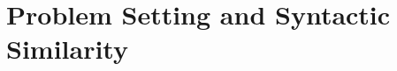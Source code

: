 \documentclass[letterpaper]{article} %
\newcommand{\realm}{{\ensuremath{M^*}}\xspace}
\newif\ifaddcomments
\newcommand{\roni}[1]{\ifaddcomments{\textcolor{red}{[Roni: #1]}}\fi}
\newcommand{\mauro}[1]{\ifaddcomments{\textcolor{green}{[Mauro: #1]}}\fi}
\newcommand{\yarin}[1]{\ifaddcomments{\textcolor{teal}{[Yarin: #1]}}\fi}
\newcommand{\leo}[1]{\ifaddcomments{\textcolor{pink}{[Leonardo: #1]}}\fi}
\begin{document}




\section{Problem Setting and Syntactic Similarity}
\label{sec:problem-setting}

\end{document}
